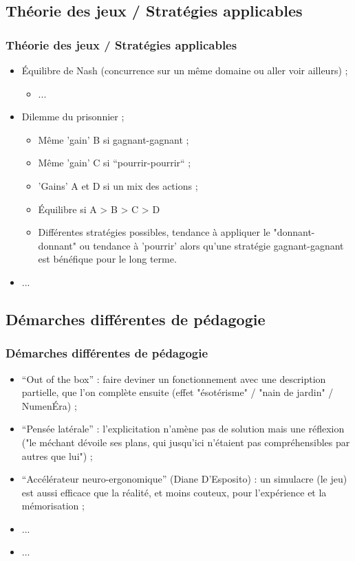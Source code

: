 \documentclass[slidetop,11pt]{beamer}
\begin{document}
\subsection{Th{\'e}orie des jeux / Strat{\'e}gies applicables}
\begin{frame}
	\frametitle{Th{\'e}orie des jeux / Strat{\'e}gies applicables}
	\begin{itemize}
		\item {\'E}quilibre de Nash (concurrence sur un m{\^e}me domaine ou aller voir ailleurs) ; 
		\begin{itemize}
			\item ... 
		\end{itemize}
		\item Dilemme du prisonnier ; 
		\begin{itemize}
			\item M{\^e}me 'gain' B si gagnant-gagnant ;  
			\item M{\^e}me 'gain' C si ``pourrir-pourrir`` ; 
			\item 'Gains' A et D si un mix des actions ; 
			\item {\'E}quilibre si A > B > C > D
			\item Diff{\'e}rentes strat{\'e}gies possibles, tendance {\`a} appliquer le "donnant-donnant" ou tendance {\`a} 'pourrir' alors qu'une strat{\'e}gie gagnant-gagnant est b{\'e}n{\'e}fique pour le long terme. 
		\end{itemize}
		\item ... 
	\end{itemize}
\end{frame}

\subsection{D{\'e}marches diff{\'e}rentes de p{\'e}dagogie}
\begin{frame}
	\frametitle{D{\'e}marches diff{\'e}rentes de p{\'e}dagogie}
	\begin{itemize}
		\item ``Out of the box'' : faire deviner un fonctionnement avec une description partielle, que l'on compl{\`e}te ensuite (effet "{\'e}sot{\'e}risme" / "nain de jardin" / Numen{\'E}ra) ; 
		\item ``Pens{\'e}e lat{\'e}rale'' : l'explicitation n'am{\`e}ne pas de solution mais une r{\'e}flexion ("le m{\'e}chant d{\'e}voile ses plans, qui jusqu'ici n'{\'e}taient pas compr{\'e}hensibles par autres que lui") ;
		\item ``Acc{\'e}l{\'e}rateur neuro-ergonomique'' (Diane D'Esposito) : un simulacre (le jeu) est aussi efficace que la r{\'e}alit{\'e}, et moins couteux, pour l'exp{\'e}rience et la m{\'e}morisation ; 
		\item ... 
		\item ... 
	\end{itemize}
\end{frame}
\end{document}
